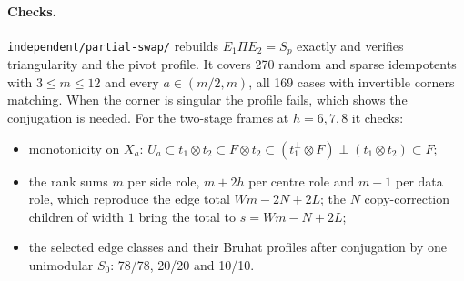 \documentclass[11pt]{article}
\theoremstyle{remark}\newtheorem*{remark}{Remark}
\begin{document}
\paragraph{Checks.} \texttt{independent/partial-swap/} rebuilds $E_1\Pi E_2=S_p$ exactly and verifies triangularity
and the pivot profile. It covers 270 random and sparse idempotents with $3\le m\le12$ and every $a\in(m/2,m)$, all
169 cases with invertible corners matching. When the corner is singular the profile fails, which shows the
conjugation is needed. For the two-stage frames at $h=6,7,8$ it checks:
\begin{itemize}
\item monotonicity on $X_a$: $U_a\subset t_1\otimes t_2\subset F\otimes t_2\subset(t_1^\perp\otimes F)\perp(t_1\otimes t_2)\subset F$;
\item the rank sums $m$ per side role, $m+2h$ per centre role and $m-1$ per data role, which reproduce the edge total $Wm-2N+2L$; the $N$ copy-correction children of width $1$ bring the total to $s=Wm-N+2L$;
\item the selected edge classes and their Bruhat profiles after conjugation by one unimodular $S_0$:
78/78, 20/20 and 10/10.
\end{itemize}
\end{document}
